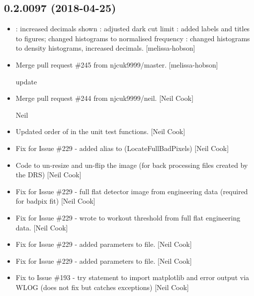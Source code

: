 \documentclass[a4paper,10pt,english]{report}
\begin{document}
\subsection{0.2.0097 (2018-04-25)}
\label{\detokenize{misc/changelog:id454}}\begin{itemize}
\item {} 
: increased decimals shown : adjusted
dark cut limit : added labels and titles to figures;
changed histograms to normalised frequency :
changed histograms to density histograms, increased decimals.
{[}melissa-hobson{]}

\item {} 
Merge pull request \#245 from njcuk9999/master. {[}melissa-hobson{]}

update

\item {} 
Merge pull request \#244 from njcuk9999/neil. {[}Neil Cook{]}

Neil

\item {} 
Updated order of  in the unit test functions. {[}Neil
Cook{]}

\item {} 
Fix for Issue \#229 - added alias to 
(LocateFullBadPixels) {[}Neil Cook{]}

\item {} 
Code to un-resize and un-flip the image (for back processing files
created by the DRS) {[}Neil Cook{]}

\item {} 
Fix for Issue \#229 - full flat detector image from engineering data
(required for badpix fit) {[}Neil Cook{]}

\item {} 
Fix for Issue \#229 - wrote  to workout threshold
from full flat engineering data. {[}Neil Cook{]}

\item {} 
Fix for Issue \#229 - added parameters to  file. {[}Neil
Cook{]}

\item {} 
Fix for Issue \#229 - added parameters to  file. {[}Neil
Cook{]}

\item {} 
Fix to Issue \#193 - try statement to import matplotlib and error
output via WLOG (does not fix but catches exceptions) {[}Neil Cook{]}


\end{itemize}
\end{document}
